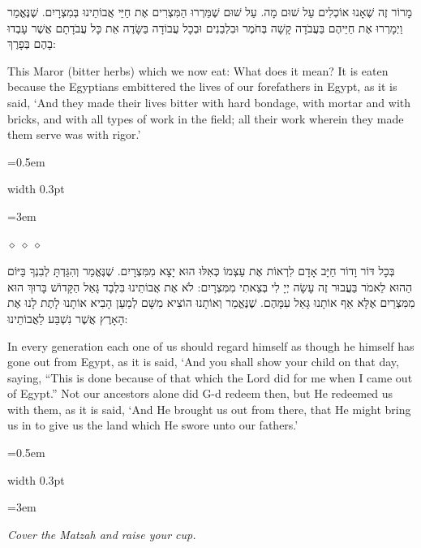 \documentclass[11pt, openany]{book}
\newcommand{\instruction}[1]{%
  \par\vspace{3pt}
  \begin{tcolorbox}[
    enhanced,
    breakable,
    colback=sederlight,
    colframe=sederlight,
    boxrule=0pt,
    left=10pt,
    right=6pt,
    top=4pt,
    bottom=4pt,
    borderline west={2pt}{0pt}{sederwine!60},
    arc=0pt,
    outer arc=0pt,
  ]
    {\small\itshape\textcolor{sederwine}{#1}}
  \end{tcolorbox}
  \par\vspace{2pt}
}
\newcommand{\sederdivider}{%
  \par\vspace{6pt}
  \begin{center}
    \textcolor{sedergold}{\pgfornament[width=1.5cm]{11}}
  \end{center}
  \par\vspace{6pt}
}
\newlength{\bidiHebWidth}
\newlength{\bidiEngWidth}
\newenvironment{bilingual}{%
  \par\vspace{4pt}%
}{%
  \noindent
  \begin{minipage}[t]{\bidiEngWidth}
    \setstretch{1.4}\emergencystretch=0.5em\normalsize
    \usebox{\bidiEngBox}
  \end{minipage}%
  \hfill
  {\color{sedergold}\vrule width 0.3pt}%
  \hfill
  \begin{minipage}[t]{\bidiHebWidth}
    \begingroup\hebrewfont\TeXXeTstate=1\beginR
    \large\setstretch{1.4}\emergencystretch=3em\tolerance=9999\parindent=0pt\relax
    \usebox{\bidiHebBox}
    \endR\endgroup
  \end{minipage}%
  \par\vspace{2pt}%
}
\newenvironment{hebrewcol}{%
  \begin{lrbox}{\bidiHebBox}\begin{minipage}{\bidiHebWidth}%
}{%
  \end{minipage}\end{lrbox}%
}
\newenvironment{englishcol}{%
  \begin{lrbox}{\bidiEngBox}\begin{minipage}{\bidiEngWidth}%
}{%
  \end{minipage}\end{lrbox}%
}
\newcommand{\parasep}{%
  \par\vspace{3pt}
  \begin{center}
    \textcolor{sedergold!50}{\tiny$\diamond\;\diamond\;\diamond$}
  \end{center}
  \par\vspace{3pt}
}
\begin{document}
\begin{bilingual}
\begin{hebrewcol}
מָרוֹר זֶה שֶׁאָנוּ אוֹכְלִים עַל שׁוּם מָה. עַל שׁוּם שֶׁמֵּרְרוּ הַמִּצְרִים אֶת חַיֵּי אֲבוֹתֵינוּ בְּמִצְרָיִם. שֶׁנֶּאֱמַר וַיְמָרְרוּ אֶת חַיֵּיהֶם בַּעֲבֹדָה קָשָׁה בְּחֹמֶר וּבִלְבֵנִים וּבְכָל עֲבוֹדָה בַּשָּׂדֶה אֵת כָּל עֲבֹדָתָם אֲשֶׁר עָבְדוּ בָהֶם בְּפָרֶךְ:
\end{hebrewcol}
\begin{englishcol}
This Maror (bitter herbs) which we now eat: What does it mean? It is eaten because the Egyptians embittered the lives of our forefathers in Egypt, as it is said, `And they made their lives bitter with hard bondage, with mortar and with bricks, and with all types of work in the field; all their work wherein they made them serve was with rigor.'
\end{englishcol}
\end{bilingual}
\parasep

\begin{bilingual}
\begin{hebrewcol}
בְּכָל דּוֹר וָדוֹר חַיָּב אָדָם לִרְאוֹת אֶת עַצְמוֹ כְּאִלּוּ הוּא יָצָא מִמִּצְרָיִם. שֶׁנֶּאֱמַר וְהִגַּדְתָּ לְבִנְךָ בַּיּוֹם הַהוּא לֵאמֹר בַּעֲבוּר זֶה עָשָׂה יְיָ לִי בְּצֵאתִי מִמִּצְרָיִם: לֹא אֶת אֲבוֹתֵינוּ בִּלְבָד גָּאַל הַקָּדוֹשׁ בָּרוּךְ הוּא מִמִּצְרַיִם אֶלָּא אַף אוֹתָנוּ גָּאַל עִמָּהֶם. שֶׁנֶּאֱמַר וְאוֹתָנוּ הוֹצִיא מִשָּׁם לְמַעַן הָבִיא אוֹתָנוּ לָתֶת לָנוּ אֶת הָאָרֶץ אֲשֶׁר נִשְׁבַּע לַאֲבוֹתֵינוּ:
\end{hebrewcol}
\begin{englishcol}
In every generation each one of us should regard himself as though he himself has gone out from Egypt, as it is said, `And you shall show your child on that day, saying, ``This is done because of that which the Lord did for me when I came out of Egypt.'' Not our ancestors alone did G-d redeem then, but He redeemed us with them, as it is said, `And He brought us out from there, that He might bring us in to give us the land which He swore unto our fathers.'
\end{englishcol}
\end{bilingual}
\sederdivider

\instruction{Cover the Matzah and raise your cup.}
\end{document}
